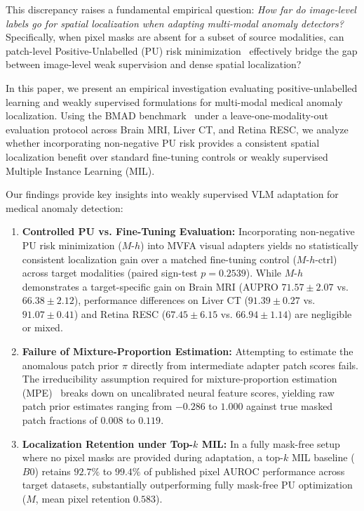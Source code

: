 \documentclass[10pt,twocolumn,letterpaper]{article}
\begin{document}
This discrepancy raises a fundamental empirical question: \emph{How far do image-level labels go for spatial localization when adapting multi-modal anomaly detectors?} Specifically, when pixel masks are absent for a subset of source modalities, can patch-level Positive-Unlabelled (PU) risk minimization~\cite{elkan2008pu, kiryo2017nnpu} effectively bridge the gap between image-level weak supervision and dense spatial localization?

In this paper, we present an empirical investigation evaluating positive-unlabelled learning and weakly supervised formulations for multi-modal medical anomaly localization. Using the BMAD benchmark~\cite{bmad2024} under a leave-one-modality-out evaluation protocol across Brain MRI, Liver CT, and Retina RESC, we analyze whether incorporating non-negative PU risk provides a consistent spatial localization benefit over standard fine-tuning controls or weakly supervised Multiple Instance Learning (MIL).

Our findings provide key insights into weakly supervised VLM adaptation for medical anomaly detection:
\begin{enumerate}
    \item \textbf{Controlled PU vs. Fine-Tuning Evaluation:} Incorporating non-negative PU risk minimization ($M\text{-}h$) into MVFA visual adapters yields no statistically consistent localization gain over a matched fine-tuning control ($M\text{-}h\text{-ctrl}$) across target modalities (paired sign-test $p = 0.2539$). While $M\text{-}h$ demonstrates a target-specific gain on Brain MRI (AUPRO $71.57 \pm 2.07$ vs. $66.38 \pm 2.12$), performance differences on Liver CT ($91.39 \pm 0.27$ vs. $91.07 \pm 0.41$) and Retina RESC ($67.45 \pm 6.15$ vs. $66.94 \pm 1.14$) are negligible or mixed.
    \item \textbf{Failure of Mixture-Proportion Estimation:} Attempting to estimate the anomalous patch prior $\pi$ directly from intermediate adapter patch scores fails. The irreducibility assumption required for mixture-proportion estimation (MPE)~\cite{ramaswamy2016mpe} breaks down on uncalibrated neural feature scores, yielding raw patch prior estimates ranging from $-0.286$ to $1.000$ against true masked patch fractions of $0.008$ to $0.119$.
    \item \textbf{Localization Retention under Top-$k$ MIL:} In a fully mask-free setup where no pixel masks are provided during adaptation, a top-$k$ MIL baseline ($B0$) retains $92.7\%$ to $99.4\%$ of published pixel AUROC performance across target datasets, substantially outperforming fully mask-free PU optimization ($M$, mean pixel retention $0.583$).
\end{enumerate}
\end{document}
